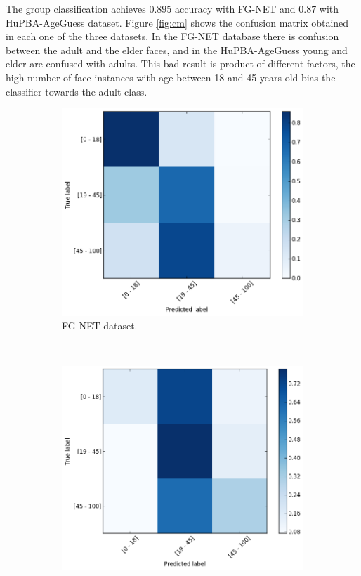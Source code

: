 The group classification achieves $0.895$ accuracy with FG-NET and $0.87$ with HuPBA-AgeGuess dataset. Figure \ref{fig:cm} shows the confusion matrix obtained in each one of the three datasets. In the FG-NET database there is confusion between the adult and the elder faces, and in the HuPBA-AgeGuess young and elder are confused with adults. This bad result is product of different factors, the high number of face instances with age between 18 and 45 years old bias the classifier towards the adult class.

\begin{figure}[!h]
	\centering
	\begin{subfigure}[b]{0.5\textwidth}
		\includegraphics[width=\textwidth]{figures/FG-NETconf_mat}
		\caption{FG-NET dataset.}
		\label{fig:cmfgnet}
	\end{subfigure}%
	~
	\begin{subfigure}[b]{0.5\textwidth}
		\includegraphics[width=\textwidth]{figures/real_conf_mat}

\end{subfigure}
\end{figure}
